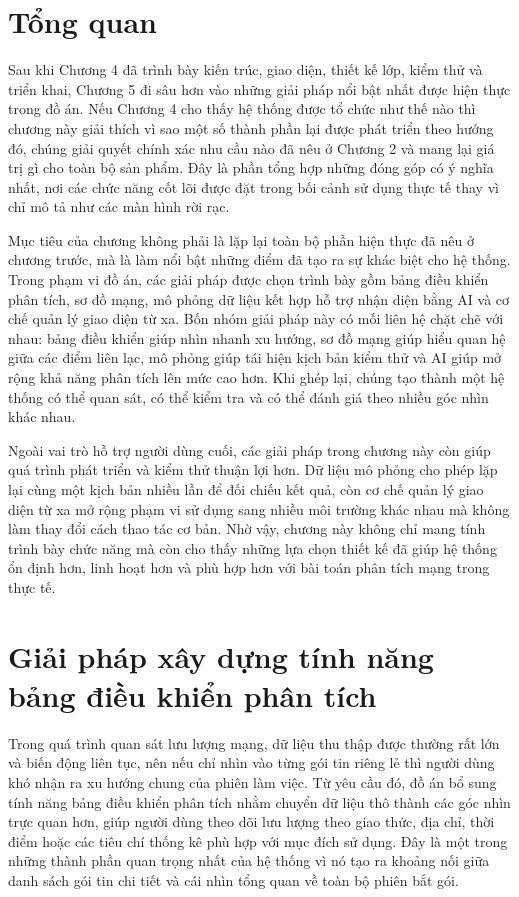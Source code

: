 \documentclass[../DoAn.tex]{subfiles}
\begin{document}
\section{Tổng quan}
Sau khi Chương 4 đã trình bày kiến trúc, giao diện, thiết kế lớp, kiểm thử và triển khai, Chương 5 đi sâu hơn vào những giải pháp nổi bật nhất được hiện thực trong đồ án. Nếu Chương 4 cho thấy hệ thống được tổ chức như thế nào thì chương này giải thích vì sao một số thành phần lại được phát triển theo hướng đó, chúng giải quyết chính xác nhu cầu nào đã nêu ở Chương 2 và mang lại giá trị gì cho toàn bộ sản phẩm. Đây là phần tổng hợp những đóng góp có ý nghĩa nhất, nơi các chức năng cốt lõi được đặt trong bối cảnh sử dụng thực tế thay vì chỉ mô tả như các màn hình rời rạc.

Mục tiêu của chương không phải là lặp lại toàn bộ phần hiện thực đã nêu ở chương trước, mà là làm nổi bật những điểm đã tạo ra sự khác biệt cho hệ thống. Trong phạm vi đồ án, các giải pháp được chọn trình bày gồm bảng điều khiển phân tích, sơ đồ mạng, mô phỏng dữ liệu kết hợp hỗ trợ nhận diện bằng AI và cơ chế quản lý giao diện từ xa. Bốn nhóm giải pháp này có mối liên hệ chặt chẽ với nhau: bảng điều khiển giúp nhìn nhanh xu hướng, sơ đồ mạng giúp hiểu quan hệ giữa các điểm liên lạc, mô phỏng giúp tái hiện kịch bản kiểm thử và AI giúp mở rộng khả năng phân tích lên mức cao hơn. Khi ghép lại, chúng tạo thành một hệ thống có thể quan sát, có thể kiểm tra và có thể đánh giá theo nhiều góc nhìn khác nhau.

Ngoài vai trò hỗ trợ người dùng cuối, các giải pháp trong chương này còn giúp quá trình phát triển và kiểm thử thuận lợi hơn. Dữ liệu mô phỏng cho phép lặp lại cùng một kịch bản nhiều lần để đối chiếu kết quả, còn cơ chế quản lý giao diện từ xa mở rộng phạm vi sử dụng sang nhiều môi trường khác nhau mà không làm thay đổi cách thao tác cơ bản. Nhờ vậy, chương này không chỉ mang tính trình bày chức năng mà còn cho thấy những lựa chọn thiết kế đã giúp hệ thống ổn định hơn, linh hoạt hơn và phù hợp hơn với bài toán phân tích mạng trong thực tế.

\section{Giải pháp xây dựng tính năng bảng điều khiển phân tích}
Trong quá trình quan sát lưu lượng mạng, dữ liệu thu thập được thường rất lớn và biến động liên tục, nên nếu chỉ nhìn vào từng gói tin riêng lẻ thì người dùng khó nhận ra xu hướng chung của phiên làm việc. Từ yêu cầu đó, đồ án bổ sung tính năng bảng điều khiển phân tích nhằm chuyển dữ liệu thô thành các góc nhìn trực quan hơn, giúp người dùng theo dõi lưu lượng theo giao thức, địa chỉ, thời điểm hoặc các tiêu chí thống kê phù hợp với mục đích sử dụng. Đây là một trong những thành phần quan trọng nhất của hệ thống vì nó tạo ra khoảng nối giữa danh sách gói tin chi tiết và cái nhìn tổng quan về toàn bộ phiên bắt gói.
\end{document}
